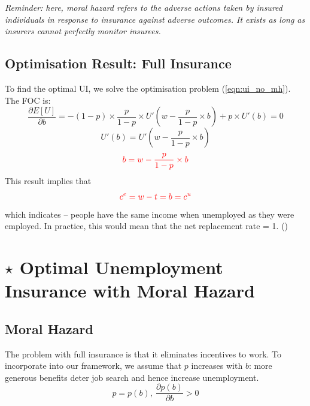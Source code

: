                 \emph{Reminder: here, moral hazard refers to the adverse actions taken by insured individuals in response to insurance against adverse outcomes. It exists as long as insurers cannot perfectly monitor insurees.}
                
        \subsection{Optimisation Result: Full Insurance}
            To find the optimal UI, we solve the optimisation problem (\ref{eqn:ui_no_mh}). The FOC is:
            $$\frac{\partial E[U]}{\partial b}=-(1-p)\times{\frac{p}{1-p}}\times{U'(w-\frac{p}{1-p}\times{b})} + p\times{U'(b)} = 0$$
            $$U'(b) = U'(w-\frac{p}{1-p}\times{b})$$
            $$\color{red} b = w-\frac{p}{1-p}\times{b}$$
            This result implies that
            \[\color{red} c^e = w-t = b = c^u\]
            which indicates  -- people have the same income when unemployed as they were employed. In practice, this would mean that the net replacement rate = 1. ()
            
\section{$\star$ Optimal Unemployment Insurance with Moral Hazard}

    \subsection{Moral Hazard}
        The problem with full insurance is that it eliminates incentives to work. To incorporate  into our framework, we assume that $p$ increases with $b$: more generous benefits deter job search and hence increase unemployment.
        $$p=p(b),\ \frac{\partial p(b)}{\partial b}>0$$
        
